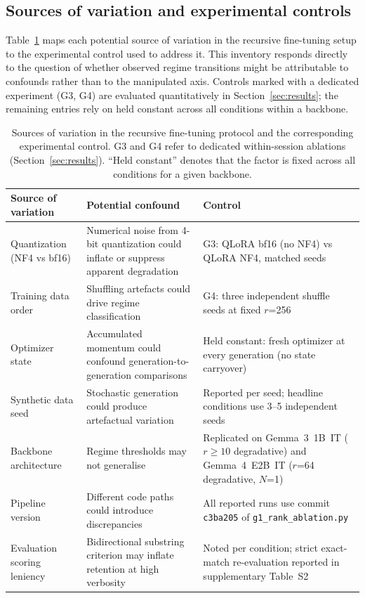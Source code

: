 \documentclass[a4paper,fleqn]{cas-dc}
\newif\ifshowchanges
\newcommand{\rev}[1]{\ifshowchanges{\color{blue}#1}\else{#1}\fi}
\begin{document}
\rev{%
\subsection{Sources of variation and experimental controls}\label{sec:controls}

Table~\ref{tab:controls} maps each potential source of variation in the
recursive fine-tuning setup to the experimental control used to address it.
This inventory responds directly to the question of whether observed regime
transitions might be attributable to confounds rather than to the manipulated
axis. Controls marked with a dedicated experiment (G3, G4) are evaluated
quantitatively in Section~\ref{sec:results}; the remaining entries rely on
held constant across all conditions within a backbone.

\begin{table}[h]
\caption{\rev{Sources of variation in the recursive fine-tuning protocol and
the corresponding experimental control. G3 and G4 refer to dedicated
within-session ablations (Section~\ref{sec:results}). ``Held constant''
denotes that the factor is fixed across all conditions for a given backbone.}}
\label{tab:controls}
\small
\begin{tabular*}{\columnwidth}{@{\extracolsep{\fill}}>{\raggedright\arraybackslash}p{3.5cm}>{\raggedright\arraybackslash}p{4cm}>{\raggedright\arraybackslash}p{3cm}@{}}
\toprule
\textbf{Source of variation} & \textbf{Potential confound} & \textbf{Control} \\
\midrule
Quantization (NF4 vs bf16) & Numerical noise from 4-bit quantization could inflate or suppress apparent degradation & G3: QLoRA bf16 (no NF4) vs QLoRA NF4, matched seeds \\
\addlinespace
Training data order & Shuffling artefacts could drive regime classification & G4: three independent shuffle seeds at fixed $r$=256 \\
\addlinespace
Optimizer state & Accumulated momentum could confound generation-to-generation comparisons & Held constant: fresh optimizer at every generation (no state carryover) \\
\addlinespace
Synthetic data seed & Stochastic generation could produce artefactual variation & Reported per seed; headline conditions use 3–5 independent seeds \\
\addlinespace
Backbone architecture & Regime thresholds may not generalise & Replicated on Gemma~3~1B~IT ($r \geq 10$ degradative) and Gemma~4~E2B~IT ($r$=64 degradative, $N$=1) \\
\addlinespace
Pipeline version & Different code paths could introduce discrepancies & All reported runs use commit \texttt{c3ba205} of \texttt{g1\_rank\_ablation.py} \\
\addlinespace
Evaluation scoring leniency & Bidirectional substring criterion may inflate retention at high verbosity & Noted per condition; strict exact-match re-evaluation reported in supplementary Table~S2 \\
\bottomrule
\end{tabular*}
\end{table}
}%
\end{document}

